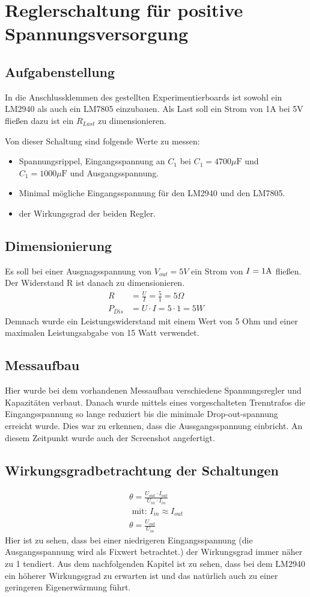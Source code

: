 \section{Reglerschaltung für positive Spannungsversorgung}
\subsection{Aufgabenstellung}
In die Anschlussklemmen des gestellten Experimentierboards ist sowohl ein LM2940 als auch ein LM7805 einzubauen. Als Last soll ein Strom von 1A bei 5V fließen dazu ist ein $R_{Last}$ zu dimensionieren. 

Von dieser Schaltung sind folgende Werte zu messen:
\begin{itemize}
    \item Spannungsrippel, Eingangsspannung an $C_1$ bei $C_1=4700\mu \text{F}$ und $C_1=1000\mu \text{F}$ und Ausgangsspannung.
    \item Minimal mögliche Eingangsspannung für den LM2940 und den LM7805.
    \item der Wirkungsgrad der beiden Regler.
\end{itemize}
\subsection{Dimensionierung}
Es soll bei einer Ausgnagsspannung von $V_{out} = 5V$ ein Strom von $I=1\rm A$ fließen. Der Widerstand R ist danach zu dimensionieren.
\begin{align}
    R&= \frac{U}{I} = \frac{5}{1} = 5\Omega \\
    P_{Dis} &= U \cdot I = 5\cdot 1 = 5 W
\end{align}
Demnach wurde ein Leistungswiderstand mit einem Wert von 5 Ohm und einer maximalen Leistungsabgabe von 15 Watt verwendet.
\subsection{Messaufbau}
Hier wurde bei dem vorhandenen Messaufbau verschiedene Spannungsregler und Kapazitäten verbaut. Danach wurde mittels eines vorgeschalteten Trenntrafos die Eingangsspannung so lange reduziert bis die minimale Drop-out-spannung erreicht wurde. Dies war zu erkennen, dass die Aussgangsspannung einbricht. An diesem Zeitpunkt wurde auch der Screenshot angefertigt. 
\subsection{Wirkungsgradbetrachtung der Schaltungen}
\begin{align}
    \theta = \frac{U_{out}\cdot I_{out}}{U_{in}\cdot I_{in}} \\
    \text{ mit: } I_{in} \approx I_{out} \\
    \theta = \frac{U_{out}}{U_{in}}
\end{align}
Hier ist zu sehen, dass bei einer niedrigeren Eingangsspannung (die Ausgangsspannung wird als Fixwert betrachtet.) der Wirkungsgrad immer näher zu 1 tendiert. Aus dem nachfolgenden Kapitel ist zu sehen, dass bei dem LM2940 ein höherer Wirkungsgrad zu erwarten ist und das natürlich auch zu einer geringeren Eigenerwärmung führt. 
